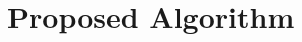 \documentclass[review]{elsarticle}
\begin{document}
%
%
%
%
%


\section{Proposed Algorithm}
\label{sec:ourapproach}
\end{document}
